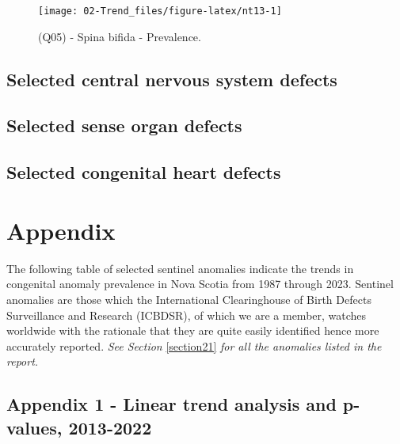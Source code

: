 \documentclass[
]{krantz}
\begin{document}
\begin{figure}[h]

{\centering \texttt{[image: 02-Trend\_files/figure-latex/nt13-1]} 

}

\caption{(Q05) - Spina bifida - Prevalence.}\label{fig:nt13}
\end{figure}

\clearpage

\hypertarget{section33}{%
\section{Selected central nervous system defects}\label{section33}}

\clearpage

\hypertarget{section34}{%
\section{Selected sense organ defects}\label{section34}}

\clearpage

\hypertarget{section35}{%
\section{Selected congenital heart defects}\label{section35}}

\clearpage

\hypertarget{appendix}{%
\chapter*{Appendix}\label{appendix}}


The following table of selected sentinel anomalies indicate the trends in congenital anomaly prevalence in Nova Scotia from 1987 through 2023. Sentinel anomalies are those which the International Clearinghouse of Birth Defects Surveillance and Research (ICBDSR), of which we are a member, watches worldwide with the rationale that they are quite easily identified hence more accurately reported. \emph{See Section} \ref{section21} \emph{for all the anomalies listed in the report.}

\hypertarget{section-a1}{%
\section{Appendix 1 - Linear trend analysis and p-values, 2013-2022}\label{section-a1}}
\end{document}
